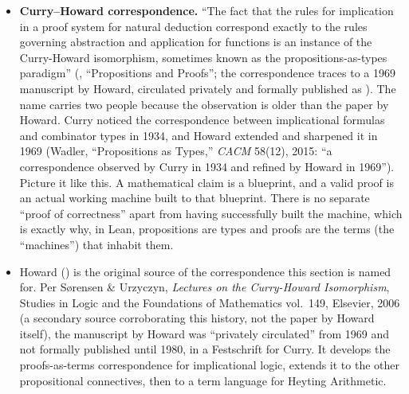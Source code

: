 \begin{itemize}
\tightlist
\item
  \textbf{Curry--Howard correspondence.} ``The fact that the rules for implication in a proof system for natural deduction correspond exactly to the rules governing abstraction and application for functions is an instance of the Curry-Howard isomorphism, sometimes known as the propositions-as-types paradigm'' (\cite{TPIL4}, ``Propositions and Proofs''; the correspondence traces to a 1969 manuscript by Howard, circulated privately and formally published as \cite{Howard1980}). The name carries two people because the observation is older than the paper by Howard. Curry noticed the correspondence between implicational formulas and combinator types in 1934, and Howard extended and sharpened it in 1969 (Wadler, ``Propositions as Types,'' \emph{CACM} 58(12), 2015: ``a correspondence observed by Curry in 1934 and refined by Howard in 1969''). Picture it like this. A mathematical claim is a blueprint, and a valid proof is an actual working machine built to that blueprint. There is no separate ``proof of correctness'' apart from having successfully built the machine, which is exactly why, in Lean, propositions are types and proofs are the terms (the ``machines'') that inhabit them.
\item
  Howard (\cite{Howard1980}) is the original source of the correspondence this section is named for. Per Sørensen \& Urzyczyn, \emph{Lectures on the Curry-Howard Isomorphism}, Studies in Logic and the Foundations of Mathematics vol.~149, Elsevier, 2006 (a secondary source corroborating this history, not the paper by Howard itself), the manuscript by Howard was ``privately circulated'' from 1969 and not formally published until 1980, in a Festschrift for Curry. It develops the proofs-as-terms correspondence for implicational logic, extends it to the other propositional connectives, then to a term language for Heyting Arithmetic.
\end{itemize}
